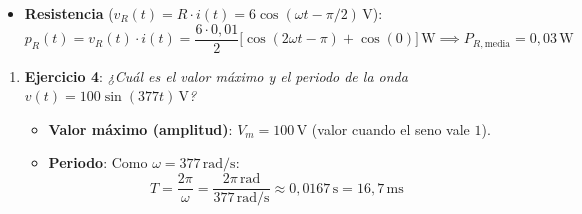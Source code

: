 \begin{ejemplo}
\begin{enumerate}
\begin{itemize}
\begin{equation*}
            \boxed{P_{V2,\text{media}} = -0{,}03\cdot(-1) = +0{,}03\,\si{\watt}} \quad (\text{suministra } 30\,\si{\milli\watt})
        \end{equation*}
        \item \textbf{Resistencia} ($v_R(t) = R\cdot i(t) = 6\cos(\omega t - \pi/2)\,\si{\volt}$):
        \begin{equation*}
            p_R(t) = v_R(t)\cdot i(t) = \frac{6\cdot 0{,}01}{2}\big[\cos(2\omega t - \pi) + \cos(0)\big]\,\si{\watt} \implies \boxed{P_{R,\text{media}} = 0{,}03\,\si{\watt}}
        \end{equation*}
    \end{itemize}
\end{enumerate}
\end{ejemplo}

\begin{ejercicio}
\begin{enumerate}
    \item \textbf{Ejercicio 4}: \emph{¿Cuál es el valor máximo y el periodo de la onda $v(t) = 100\sin(377 t)\,\si{\volt}$?}
    \begin{itemize}
        \item \textbf{Valor máximo (amplitud)}: $V_m = \boxed{100\,\si{\volt}}$ (valor cuando el seno vale $1$).
        \item \textbf{Periodo}: Como $\omega = 377\,\si{\radian/\second}$:
        \begin{equation*}
            \boxed{T = \frac{2\pi}{\omega} = \frac{2\pi\,\si{\radian}}{377\,\si{\radian/\second}} \approx 0{,}0167\,\si{\second} = 16{,}7\,\si{\milli\second}}
        \end{equation*}
    \end{itemize}


\end{enumerate}
\end{ejercicio}
